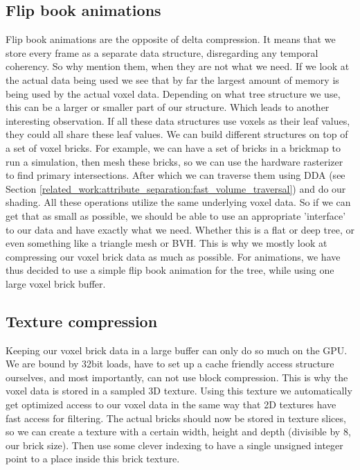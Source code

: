 \subsection{Flip book animations} \label{approach:flipbook_animations}
Flip book animations are the opposite of delta compression. It means that we store every frame as a separate data structure, disregarding any temporal coherency. So why mention them, when they are not what we need. If we look at the actual data being used we see that by far the largest amount of memory is being used by the actual voxel data. Depending on what tree structure we use, this can be a larger or smaller part of our structure. Which leads to another interesting observation. If all these data structures use voxels as their leaf values, they could all share these leaf values. We can build different structures on top of a set of voxel bricks. For example, we can have a set of bricks in a brickmap to run a simulation, then mesh these bricks, so we can use the hardware rasterizer to find primary intersections. After which we can traverse them using DDA (see Section \ref{related_work:attribute_separation:fast_volume_traversal}) and do our shading. All these operations utilize the same underlying voxel data. So if we can get that as small as possible, we should be able to use an appropriate 'interface' to our data and have exactly what we need. Whether this is a flat or deep tree, or even something like a triangle mesh or BVH. This is why we mostly look at compressing our voxel brick data as much as possible. For animations, we have thus decided to use a simple flip book animation for the tree, while using one large voxel brick buffer.
\subsection{Texture compression} \label{approach:texture_compression}
Keeping our voxel brick data in a large buffer can only do so much on the GPU. We are bound by 32bit loads, have to set up a cache friendly access structure ourselves, and most importantly, can not use block compression. This is why the voxel data is stored in a sampled 3D texture. Using this texture we automatically get optimized access to our voxel data in the same way that 2D textures have fast access for filtering. The actual bricks should now be stored in texture slices, so we can create a texture with a certain width, height and depth (divisible by 8, our brick size). Then use some clever indexing to have a single unsigned integer point to a place inside this brick texture.


